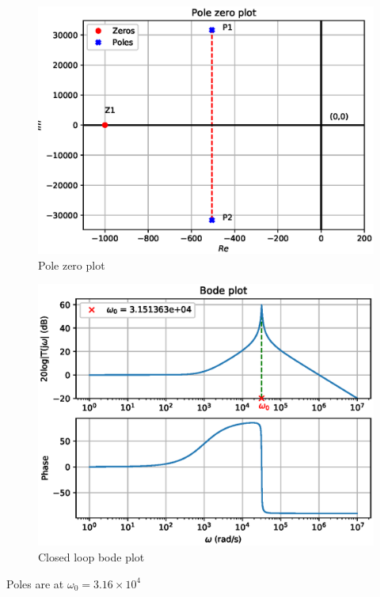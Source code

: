 \begin{enumerate}[label=\arabic*.,ref=\theenumi]
\begin{figure}[!ht]
    \centering
    \includegraphics[width=\columnwidth]{./figs/ee18btech11028/fig_3.eps}
    \caption{Pole zero plot}
    \label{fig:ee18btech11028_2_3}
\end{figure}


\begin{figure}[!ht]
    \centering
    \includegraphics[width=\columnwidth]{./figs/ee18btech11028/fig_4.eps}
    \caption{Closed loop bode plot}
    \label{fig:ee18btech11028_2_4}
\end{figure}

Poles are at $\omega_{0} = 3.16 \times 10^{4}$


\end{enumerate}
